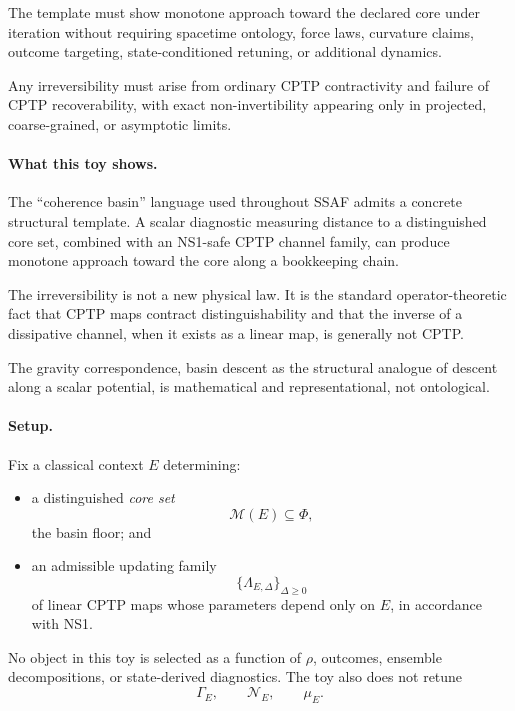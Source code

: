 \documentclass[aps,prx,onecolumn,11pt]{revtex4-2}
\theoremstyle{plain}
\theoremstyle{definition}
\theoremstyle{remark}
\begin{document}
The template must show monotone approach toward the declared core under
iteration without requiring spacetime ontology, force laws, curvature
claims, outcome targeting, state-conditioned retuning, or additional
dynamics.

Any irreversibility must arise from ordinary CPTP contractivity and
failure of CPTP recoverability, with exact non-invertibility appearing
only in projected, coarse-grained, or asymptotic limits.

\paragraph{What this toy shows.}

The ``coherence basin'' language used throughout SSAF admits a concrete
structural template. A scalar diagnostic measuring distance to a
distinguished core set, combined with an NS1-safe CPTP channel family,
can produce monotone approach toward the core along a bookkeeping chain.

The irreversibility is not a new physical law. It is the standard
operator-theoretic fact that CPTP maps contract distinguishability and
that the inverse of a dissipative channel, when it exists as a linear
map, is generally not CPTP.

The gravity correspondence, basin descent as the structural analogue of
descent along a scalar potential, is mathematical and representational,
not ontological.

\paragraph{Setup.}

Fix a classical context \(E\) determining:

\begin{itemize}

\item a distinguished \emph{core set}
\[
\mathcal M(E)\subseteq\Phi,
\]
the basin floor; and

\item an admissible updating family
\[
\{\Lambda_{E,\Delta}\}_{\Delta\geq 0}
\]
of linear CPTP maps whose parameters depend only on \(E\), in
accordance with NS1.

\end{itemize}

No object in this toy is selected as a function of \(\rho\), outcomes,
ensemble decompositions, or state-derived diagnostics. The toy also
does not retune
\[
\Gamma_E,
\qquad
\mathcal N_E,
\qquad
\mu_E.
\]
\end{document}
